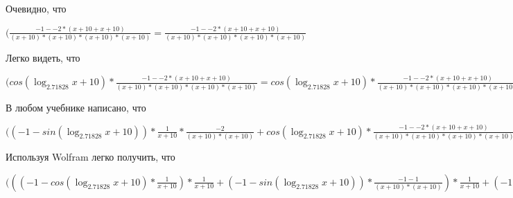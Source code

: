 \documentclass[12pt,a4paper,fleqn]{article}
\theoremstyle{definition}
\begin{document}
Очевидно, что

$(\frac{ -1  -  -2  * ( x  +  10  +  x  +  10 )}{( x  +  10 ) * ( x  +  10 ) * ( x  +  10 ) * ( x  +  10 )}
 = \frac{ -1  -  -2  * ( x  +  10  +  x  +  10 )}{( x  +  10 ) * ( x  +  10 ) * ( x  +  10 ) * ( x  +  10 )}
$

Легко видеть, что

$(cos(\log_{ 2.71828 }{ x  +  10 }) * \frac{ -1  -  -2  * ( x  +  10  +  x  +  10 )}{( x  +  10 ) * ( x  +  10 ) * ( x  +  10 ) * ( x  +  10 )}
 = cos(\log_{ 2.71828 }{ x  +  10 }) * \frac{ -1  -  -2  * ( x  +  10  +  x  +  10 )}{( x  +  10 ) * ( x  +  10 ) * ( x  +  10 ) * ( x  +  10 )}
$

В любом учебнике написано, что

$(( -1  - sin(\log_{ 2.71828 }{ x  +  10 })) * \frac{ 1 }{ x  +  10 }
 * \frac{ -2 }{( x  +  10 ) * ( x  +  10 )}
 + cos(\log_{ 2.71828 }{ x  +  10 }) * \frac{ -1  -  -2  * ( x  +  10  +  x  +  10 )}{( x  +  10 ) * ( x  +  10 ) * ( x  +  10 ) * ( x  +  10 )}
 = ( -1  - sin(\log_{ 2.71828 }{ x  +  10 })) * \frac{ 1 }{ x  +  10 }
 * \frac{ -2 }{( x  +  10 ) * ( x  +  10 )}
 + cos(\log_{ 2.71828 }{ x  +  10 }) * \frac{ -1  -  -2  * ( x  +  10  +  x  +  10 )}{( x  +  10 ) * ( x  +  10 ) * ( x  +  10 ) * ( x  +  10 )}
$

Используя Wolfram легко получить, что

$((( -1  - cos(\log_{ 2.71828 }{ x  +  10 }) * \frac{ 1 }{ x  +  10 }
) * \frac{ 1 }{ x  +  10 }
 + ( -1  - sin(\log_{ 2.71828 }{ x  +  10 })) * \frac{ -1  -  1 }{( x  +  10 ) * ( x  +  10 )}
) * \frac{ 1 }{ x  +  10 }
 + ( -1  - sin(\log_{ 2.71828 }{ x  +  10 })) * \frac{ 1 }{ x  +  10 }
 * \frac{ -1  -  1 }{( x  +  10 ) * ( x  +  10 )}
 + ( -1  - sin(\log_{ 2.71828 }{ x  +  10 })) * \frac{ 1 }{ x  +  10 }
 * \frac{ -2 }{( x  +  10 ) * ( x  +  10 )}
 + cos(\log_{ 2.71828 }{ x  +  10 }) * \frac{ -1  -  -2  * ( x  +  10  +  x  +  10 )}{( x  +  10 ) * ( x  +  10 ) * ( x  +  10 ) * ( x  +  10 )}
 = (( -1  - cos(\log_{ 2.71828 }{ x  +  10 }) * \frac{ 1 }{ x  +  10 }
) * \frac{ 1 }{ x  +  10 }
 + ( -1  - sin(\log_{ 2.71828 }{ x  +  10 })) * \frac{ -1  -  1 }{( x  +  10 ) * ( x  +  10 )}
) * \frac{ 1 }{ x  +  10 }
 + ( -1  - sin(\log_{ 2.71828 }{ x  +  10 })) * \frac{ 1 }{ x  +  10 }
 * \frac{ -1  -  1 }{( x  +  10 ) * ( x  +  10 )}
 + ( -1  - sin(\log_{ 2.71828 }{ x  +  10 })) * \frac{ 1 }{ x  +  10 }
 * \frac{ -2 }{( x  +  10 ) * ( x  +  10 )}
 + cos(\log_{ 2.71828 }{ x  +  10 }) * \frac{ -1  -  -2  * ( x  +  10  +  x  +  10 )}{( x  +  10 ) * ( x  +  10 ) * ( x  +  10 ) * ( x  +  10 )}
$
\end{document}

